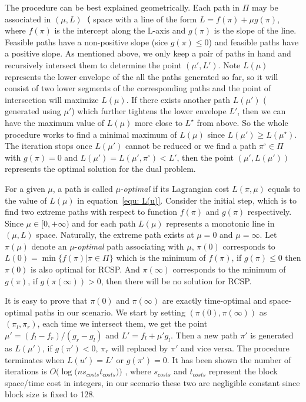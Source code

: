\documentclass{sig-alternate-05-2015}
\begin{document}
The procedure can be best explained geometrically.
Each path in $ \Pi $ may be associated in $ (\mu, L)（$ space with a line of the form $ L = f(\pi) + \mu g(\pi) $, where $ f(\pi) $ is the intercept along the L-axis and $ g(\pi) $ is the slope of the line.
Feasible paths have a non-positive slope (sice $ g(\pi) \leqslant 0 $) and feasible paths have a positive slope.
As mentioned above, we only keep a pair of paths in hand and recursively intersect them to determine the point $ (\mu',L') $.
Note $ L(\mu) $ represents the lower envelope of the all the paths generated so far, so it will consist of two lower segments of the corresponding paths and the point of intersection will maximize $ L(\mu) $.
If there exists another path $ L(\mu') $ ( generated using $ \mu' $) which further tightens the lower envelope $ L' $, then we can have the maximum value of $ L(\mu) $ more close to $ L^\star $ from above.
So the whole procedure works to find a minimal maximum of $ L(\mu) $ since $ L(\mu') \geqslant L(\mu^\star) $.
The iteration stops once $ L(\mu') $ cannot be reduced or we find a path $ \pi^\circ \in \Pi $ with $ g(\pi) = 0 $ and $ L(\mu') = L(\mu', \pi^\circ) < L' $, then the point $ (\mu', L(\mu')) $ represents the optimal solution for the dual problem.

For a given $ \mu $, a path is called $ \mu $-\textit{optimal} if its Lagrangian cost $ L(\pi,\mu) $ equals to the value of $ L(\mu) $ in equation~\eqref{equ: L(u)}.
Consider the initial step, which is to find two extreme paths with respect to function $ f(\pi) $ and $ g(\pi) $ respectively.
Since $ \mu \in [0,+\infty) $ and for each path $ L(\mu) $ represents a monotonic line in $ (\mu,L) $ space.
Naturally, the extreme path exists at $ \mu = 0 $ and $ \mu=\infty $.
Let $ \pi(\mu) $ denote an $ \mu $-\textit{optimal} path associating with $ \mu $,
$ \pi(0) $ corresponds to $ L(0) = \min\{f(\pi)|\pi \in \Pi\} $ which is the minimum of $ f(\pi) $, if $ g(\pi) \leqslant 0 $ then $ \pi(0) $ is also optimal for RCSP.
And $ \pi(\infty) $ corresponds to the minimum of $ g(\pi) $, if $ g(\pi(\infty)) > 0 $, then there will be no solution for RCSP.

It is easy to prove that $ \pi(0) $ and $ \pi(\infty) $ are exactly time-optimal and space-optimal paths in our scenario.
We start by setting $ (\pi(0),\pi(\infty)) $ as $ (\pi_l,\pi_r) $, each time we intersect them, we get the point $ \mu' = (f_l - f_r)/(g_r-g_l) $ and $ L'= f_l + \mu' g_l $.
Then a new path $ \pi' $ is generated as $ L(\mu') $, if $ g(\pi') < 0 $, $ \pi_r $ will replaced by $ \pi' $ and vice versa.
The procedure terminates when $ L(u') = L' $ or $ g(\pi') = 0 $.
It has been shown the number of iterations is $ O(\log(n $$ s_{costs} $$ t_{costs})) $ \cite{mehlhorn2000resource}, where $ s_{costs} $ and $ t_{costs} $ represent the block space/time cost in integers, in our scenario these two are negligible constant since block size is fixed to 128.
\end{document}

